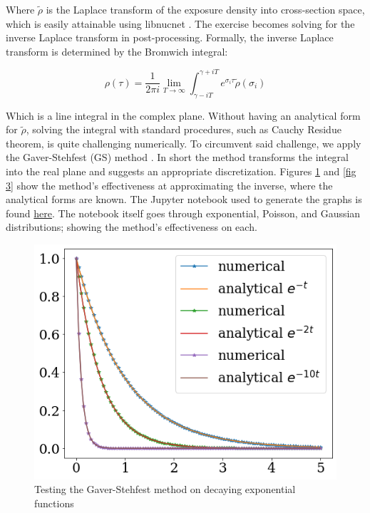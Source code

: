 \documentclass{article}
\begin{document}
Where $\tilde{\rho}$ is the Laplace transform of the exposure density into cross-section space, which is easily attainable using 
libnucnet \cite{meyer}. The exercise becomes solving for the inverse Laplace transform in post-processing. Formally, the inverse 
Laplace transform is determined by the Bromwich integral:

\begin{equation*}
    \rho(\tau) = \frac{1}{2\pi i} \lim_{T\to\infty}\int_{\gamma - iT}^{\gamma + iT}e^{\sigma_{i}\tau}\tilde{\rho}(\sigma_{i})
\end{equation*}

Which is a line integral in the complex plane. Without having an analytical form for $\tilde{\rho}$, solving the integral with standard 
procedures, such as Cauchy Residue theorem, is quite challenging numerically. To circumvent said challenge, we apply the Gaver-Stehfest (GS) 
method \cite{jacquot1983gaver}. In short the method transforms the integral into the real plane and suggests an appropriate discretization. 
Figures \ref{fig 2} and \ref{fig 3} show the method's effectiveness at approximating the inverse, where the analytical forms are known. 
The Jupyter notebook used to generate the graphs is found \href{https://github.com/jaadt7/gaver_stehfest}{here}. The notebook itself goes through 
exponential, Poisson, and Gaussian distributions; showing the method's effectiveness on each.

\begin{figure}[!htp]
    \centerline{\includegraphics[scale = 0.5]{images/exp_test_1.png}}
    \caption{Testing the Gaver-Stehfest method on decaying exponential functions}
    \label{fig 2}
\end{figure}
\end{document}

